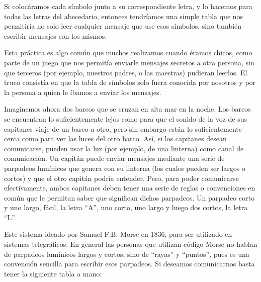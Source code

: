 Si colocáramos cada símbolo junto a su correspondiente letra, y lo hacemos para
todas las letras del abecedario, entonces tendríamos una simple tabla que nos
permitiría no solo leer cualquier mensaje que use esos símbolos, sino también
escribir mensajes con los mismos.

Esta práctica es algo común que muchos realizamos cuando éramos chicos, como
parte de un juego que nos permitía enviarle mensajes secretos a otra persona,
sin que terceros (por ejemplo, nuestros padres, o las maestras) pudieran
leerlos. El truco consistía en que la tabla de símbolos solo fuera conocida
por nosotros y por la persona a quien le íbamos a enviar los mensajes.

Imaginemos ahora dos barcos que se cruzan en alta mar en la noche. Los barcos se
encuentran lo suficientemente lejos como para que el sonido de la voz de sus
capitanes viaje de un barco a otro, pero sin embargo están lo suficientemente
cerca como para ver las luces del otro barco. Así, si los capitanes desean
comunicarse, pueden usar la luz (por ejemplo, de una linterna) como canal de
comunicación. Un capitán puede enviar mensajes mediante una serie de parpadeos
lumínicos que genera con su linterna (los cuales pueden ser largos o cortos) y
que el otro capitán podría entender. Pero, para poder comunicarse efectivamente,
ambos capitanes deben tener una serie de reglas o convenciones en común que le
permitan saber que significan dichos parpadeos. Un parpadeo corto y uno largo,
fácil, la letra ``A'', uno corto, uno largo y luego dos cortos, la letra ``L''.

Este sistema ideado por Samuel F.B. Morse en 1836, para ser utilizado en sistemas
telegráficos. En general las personas que utilizan código Morse no hablan de
parpadeos lumínicos largos y cortos, sino de ``rayas'' y ``puntos'', pues es una
convención sencilla para escribir esos parpadeos. Si deseamos comunicarnos basta
tener la siguiente tabla a mano:

